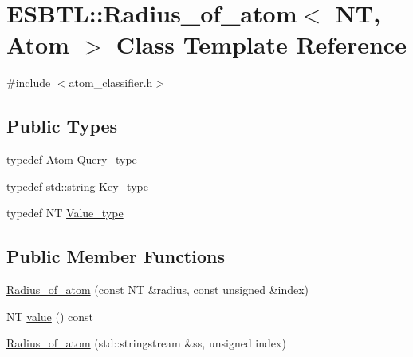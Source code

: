 \hypertarget{classESBTL_1_1Radius__of__atom}{}\section{E\+S\+B\+TL\+:\+:Radius\+\_\+of\+\_\+atom$<$ NT, Atom $>$ Class Template Reference}
\label{classESBTL_1_1Radius__of__atom}


{\ttfamily \#include $<$atom\+\_\+classifier.\+h$>$}

\subsection*{Public Types}
\begin{DoxyCompactItemize}
\item 
typedef Atom \hyperlink{classESBTL_1_1Radius__of__atom_a8aa47a2a6f72f6ab4ebaea25b67dda84}{Query\+\_\+type}
\item 
typedef std\+::string \hyperlink{classESBTL_1_1Radius__of__atom_afadc8effc34746d3f915acc7ba4cfd0e}{Key\+\_\+type}
\item 
typedef NT \hyperlink{classESBTL_1_1Radius__of__atom_a8cb44bd5cb621ec4c5665650427ec84c}{Value\+\_\+type}
\end{DoxyCompactItemize}
\subsection*{Public Member Functions}
\begin{DoxyCompactItemize}
\item 
\hyperlink{classESBTL_1_1Radius__of__atom_a1864548e1916887508cab51ad2cfe616}{Radius\+\_\+of\+\_\+atom} (const NT \&radius, const unsigned \&index)
\item 
NT \hyperlink{classESBTL_1_1Radius__of__atom_ae6747f36b286d7295f98b319cad467a0}{value} () const
\item 
\hyperlink{classESBTL_1_1Radius__of__atom_a71bf53c4053b1869d9b39216b5fc4602}{Radius\+\_\+of\+\_\+atom} (std\+::stringstream \&ss, unsigned index)
\end{DoxyCompactItemize}
